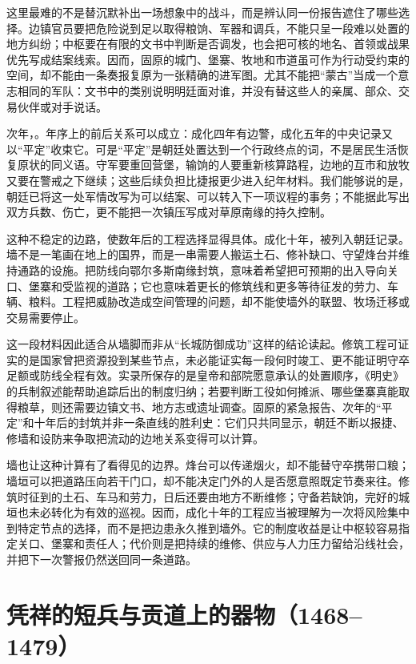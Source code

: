 这里最难的不是替沉默补出一场想象中的战斗，而是辨认同一份报告遮住了哪些选择。边镇官员要把危险说到足以取得粮饷、军器和调兵，不能只呈一段难以处置的地方纠纷；中枢要在有限的文书中判断是否调发，也会把可核的地名、首领或战果优先写成结案线索。因而，固原的城门、堡寨、牧地和市道虽可作为行动受约束的空间，却不能由一条奏报复原为一张精确的进军图。尤其不能把“蒙古”当成一个意志相同的军队：文书中的类别说明明廷面对谁，并没有替这些人的亲属、部众、交易伙伴或对手说话。

次年，。年序上的前后关系可以成立：成化四年有边警，成化五年的中央记录又以“平定”收束它。可是“平定”是朝廷处置达到一个行政终点的词，不是居民生活恢复原状的同义语。守军要重回营堡，输饷的人要重新核算路程，边地的互市和放牧又要在警戒之下继续；这些后续负担比捷报更少进入纪年材料。我们能够说的是，朝廷已将这一处军情改写为可以结案、可以转入下一项议程的事务；不能据此写出双方兵数、伤亡，更不能把一次镇压写成对草原南缘的持久控制。

这种不稳定的边路，使数年后的工程选择显得具体。成化十年，被列入朝廷记录。墙不是一笔画在地上的国界，而是一串需要人搬运土石、修补缺口、守望烽台并维持通路的设施。把防线向鄂尔多斯南缘封筑，意味着希望把可预期的出入导向关口、堡寨和受监视的道路；它也意味着更长的修筑线和更多等待征发的劳力、车辆、粮料。工程把威胁改造成空间管理的问题，却不能使墙外的联盟、牧场迁移或交易需要停止。

这一段材料因此适合从墙脚而非从“长城防御成功”这样的结论读起。修筑工程可证实的是国家曾把资源投到某些节点，未必能证实每一段何时竣工、更不能证明守卒足额或防线全程有效。实录所保存的是皇帝和部院愿意承认的处置顺序，《明史》的兵制叙述能帮助追踪后出的制度归纳；若要判断工役如何摊派、哪些堡寨真能取得粮草，则还需要边镇文书、地方志或遗址调查。固原的紧急报告、次年的“平定”和十年后的封筑并非一条直线的胜利史：它们只共同显示，朝廷不断以报捷、修墙和设防来争取把流动的边地关系变得可以计算。

墙也让这种计算有了看得见的边界。烽台可以传递烟火，却不能替守卒携带口粮；墙垣可以把道路压向若干门口，却不能决定门外的人是否愿意照既定节奏来往。修筑时征到的土石、车马和劳力，日后还要由地方不断维修；守备若缺饷，完好的城垣也未必转化为有效的巡视。因而，成化十年的工程应当被理解为一次将风险集中到特定节点的选择，而不是把边患永久推到墙外。它的制度收益是让中枢较容易指定关口、堡寨和责任人；代价则是把持续的维修、供应与人力压力留给沿线社会，并把下一次警报仍然送回同一条道路。

\section{凭祥的短兵与贡道上的器物（1468--1479）}

